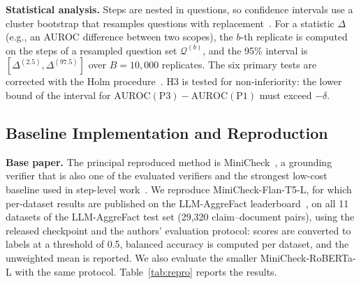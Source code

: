 \documentclass[conference]{IEEEtran}
\begin{document}
\textbf{Statistical analysis.} Steps are nested in questions, so confidence intervals use a cluster bootstrap that resamples questions with replacement~\cite{efron1993bootstrap,koehn2004significance,dror2018hitchhiker}. For a statistic $\Delta$ (e.g., an AUROC difference between two scopes), the $b$-th replicate is computed on the steps of a resampled question set $\mathcal{Q}^{(b)}$, and the 95\% interval is $[\Delta^{(2.5)},\Delta^{(97.5)}]$ over $B=10{,}000$ replicates. The six primary tests are corrected with the Holm procedure~\cite{holm1979simple}. H3 is tested for non-inferiority: the lower bound of the interval for $\mathrm{AUROC}(\mathrm{P3})-\mathrm{AUROC}(\mathrm{P1})$ must exceed $-\delta$.

\subsection{Baseline Implementation and Reproduction}
\textbf{Base paper.} The principal reproduced method is MiniCheck~\cite{tang2024minicheck}, a grounding verifier that is also one of the evaluated verifiers and the strongest low-cost baseline used in step-level work~\cite{ji2026stepgap}. We reproduce MiniCheck-Flan-T5-L, for which per-dataset results are published on the LLM-AggreFact leaderboard~\cite{llmaggrefact2026leaderboard}, on all 11 datasets of the LLM-AggreFact test set (29,320 claim--document pairs), using the released checkpoint and the authors' evaluation protocol: scores are converted to labels at a threshold of 0.5, balanced accuracy is computed per dataset, and the unweighted mean is reported. We also evaluate the smaller MiniCheck-RoBERTa-L with the same protocol. Table~\ref{tab:repro} reports the results.
\end{document}
